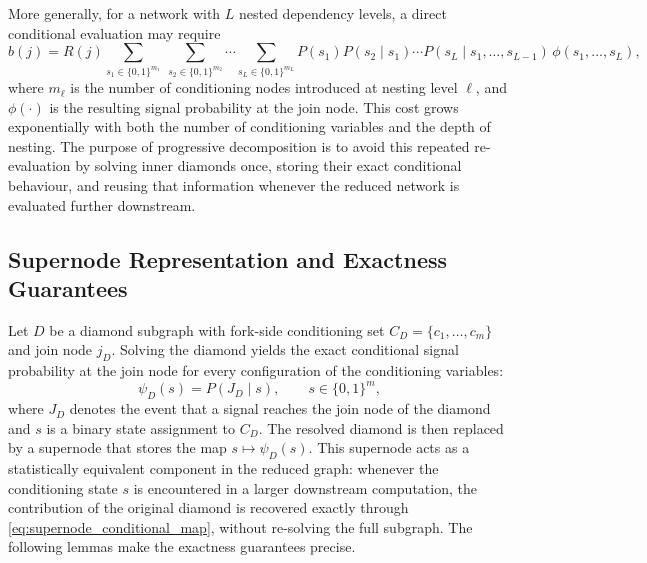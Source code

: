 \documentclass[preprint,12pt]{elsarticle}
\theoremstyle{definition}
\begin{document}
More generally, for a network with $L$ nested dependency levels, a direct conditional evaluation may
require
\begin{equation}\label{eq:nested_direct_enum}
b(j)=R(j)\!\!\sum_{s_1\in\{0,1\}^{m_1}}\ \sum_{s_2\in\{0,1\}^{m_2}}\!\!\cdots\!\!
\sum_{s_L\in\{0,1\}^{m_L}}\!\! P(s_1)P(s_2\mid s_1)\cdots P(s_L\mid s_1,\dots,s_{L-1})\,
\phi(s_1,\dots,s_L),
\end{equation}
where $m_\ell$ is the number of conditioning nodes introduced at nesting level $\ell$, and $\phi(\cdot)$
is the resulting signal probability at the join node. This cost grows exponentially with both the number
of conditioning variables and the depth of nesting. The purpose of progressive decomposition is to avoid
this repeated re-evaluation by solving inner diamonds once, storing their exact conditional behaviour,
and reusing that information whenever the reduced network is evaluated further downstream.

\subsection{Supernode Representation and Exactness Guarantees}\label{sec:supernode}

Let $D$ be a diamond subgraph with fork-side conditioning set $C_D=\{c_1,\dots,c_m\}$ and join node
$j_D$. Solving the diamond yields the exact conditional signal probability at the join node for every
configuration of the conditioning variables:
\begin{equation}\label{eq:supernode_conditional_map}
\psi_D(s)=P(J_D\mid s), \qquad s\in\{0,1\}^m,
\end{equation}
where $J_D$ denotes the event that a signal reaches the join node of the diamond and $s$ is a binary
state assignment to $C_D$. The resolved diamond is then replaced by a supernode that stores the map
$s\mapsto\psi_D(s)$. This supernode acts as a statistically equivalent component in the reduced graph:
whenever the conditioning state $s$ is encountered in a larger downstream computation, the contribution
of the original diamond is recovered exactly through \eqref{eq:supernode_conditional_map}, without
re-solving the full subgraph. The following lemmas make the exactness guarantees precise.
\end{document}
